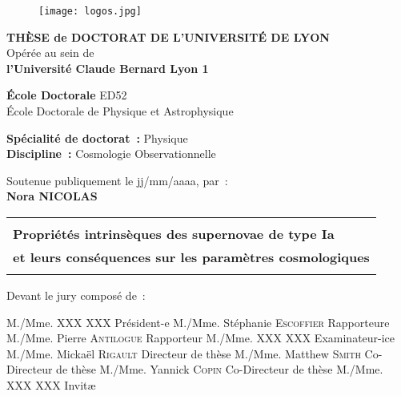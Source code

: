 \documentclass[../main/main.tex]{subfiles}
\begin{document}
\frontmatter

\begin{titlepage}
    \begin{center}
        \begin{figure}[h]
            \centering
            \texttt{[image: logos.jpg]}
        \end{figure}

        \vfill

        {\large\bfseries THÈSE de DOCTORAT DE L'UNIVERSITÉ DE LYON\\}
        {Opérée au sein de\\}
        {\large \bfseries l'Université Claude Bernard Lyon 1\\}
        \bigbreak

        {\large \textbf{École Doctorale} ED52\\
        École Doctorale de Physique et Astrophysique}
        \bigbreak

        {\large \textbf{Spécialité de doctorat~:} Physique \\}
        {\large \textbf{Discipline~:} Cosmologie Observationnelle}

        \vfill

        {Soutenue publiquement le jj/mm/aaaa, par~:\\}
        {\Large\bfseries {Nora NICOLAS}\\}
        \vspace{0.5cm}
        \begin{adjustwidth}{-10pt}{-10pt}
        \begin{tabularx}{\linewidth}{Y}
            \toprule
            \\
            \Large \bfseries Propriétés intrinsèques des supernovae de type Ia\\
            \Large \bfseries et leurs conséquences sur les paramètres
            cosmologiques\\
            \\[-0.2em]
            \bottomrule
        \end{tabularx}
        \end{adjustwidth}

        \vfill

    \end{center}

\vfill

Devant le jury composé de~: \bigbreak

M./Mme. XXX XXX \hfill Président-e\smallbreak
M./Mme. Stéphanie \textsc{Escoffier} \hfill Rapporteure\smallbreak
M./Mme. Pierre \textsc{Antilogue} \hfill Rapporteur\smallbreak
M./Mme. XXX XXX \hfill Examinateur-ice\smallbreak
M./Mme. Mickaël \textsc{Rigault} \hfill Directeur de thèse\smallbreak
M./Mme. Matthew \textsc{Smith} \hfill Co-Directeur de thèse\smallbreak
M./Mme. Yannick \textsc{Copin} \hfill Co-Directeur de thèse\smallbreak
M./Mme. XXX XXX \hfill Invitæ\smallbreak

\vfill

\end{titlepage}
\end{document}
